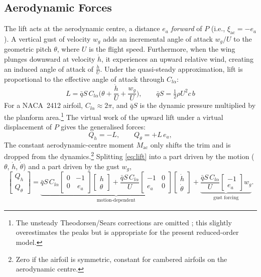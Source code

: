 \documentclass[11pt]{article}
\begin{document}
\subsection{Aerodynamic Forces}
The lift acts at the aerodynamic centre, a distance $e_a$ \emph{forward} of $P$
(i.e., $\xi_{\mathrm{ac}}=-e_a$). A vertical gust of velocity $w_g$ adds an incremental
angle of attack $w_g/U$ to the geometric pitch $\theta$, where $U$ is the flight speed.
Furthermore, when the wing plunges downward at velocity $\dot{h}$, it experiences an upward relative wind, 
creating an induced angle of attack of $\frac{\dot{h}}{U}$. Under the quasi-steady approximation, lift is proportional to the effective angle
of attack through $C_{l\alpha}$:
\begin{equation}
L = \bar{q} S\, C_{l\alpha}\Big(\theta +\frac{\dot{h}}{U} + \frac{w_g}{U}\Big),
\qquad \bar{q} S = \tfrac{1}{2}\rho U^2 c\, b
\label{eq:lift}
\end{equation}
For a NACA~2412 airfoil, $C_{l\alpha}\approx 2\pi$, and $\bar{q} S$ is the dynamic
pressure multiplied by the planform area.\footnote{The unsteady Theodorsen/Sears
corrections are omitted \cite{theodorsen1935,sears1941}; this slightly overestimates the
peaks but is appropriate for the present reduced-order model.}
The virtual work of the upward lift
under a virtual displacement of $P$ gives the generalised forces:
\begin{equation}
Q_h=-L,\qquad Q_\theta=+L\,e_a ,
\label{eq:Q}
\end{equation}
The constant aerodynamic-centre moment $M_{\mathrm{ac}}$ only shifts the trim and is dropped
from the dynamics.\footnote{Zero if the airfoil is symmetric, constant for cambered airfoils \cite{anderson2023} on the aerodynamic centre.} Splitting \eqref{eq:lift} into a part driven by the motion ($\theta$, $\dot{h}$, $\dot{\theta}$) and a
part driven by the gust $w_g$,
\begin{equation}
\begin{bmatrix}Q_h\\ Q_\theta\end{bmatrix}
=\underbrace{\bar{q} S\,C_{l\alpha}\begin{bmatrix}0&-1\\0&\ e_a\end{bmatrix}
\begin{bmatrix}h\\ \theta\end{bmatrix}
+\frac{\bar{q} S\,C_{l\alpha}}{U} \begin{bmatrix} -1 & 0 \\ e_a & 0 \end{bmatrix} \begin{bmatrix} \dot{h} \\ \dot{\theta} \end{bmatrix}}_{\text{motion-dependent}}
+\underbrace{\frac{\bar{q} S\,C_{l\alpha}}{U}\begin{bmatrix}-1\\ e_a\end{bmatrix}w_g}_{\text{gust forcing}} .
\end{equation}
\end{document}
